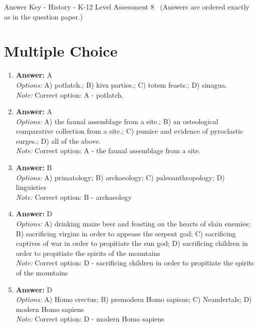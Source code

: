 \documentclass[12pt]{article}
\begin{document}
\begin{center}
Answer Key - History - K-12 Level Assessment 8 \
\small (Answers are ordered exactly as in the question paper.)
\end{center}

\section*{Multiple Choice}
\begin{enumerate}[label=\arabic*.]
\item \textbf{Answer:} A
\\ \textit{Options:} A) potlatch.; B) kiva parties.; C) totem feasts.; D) sinagua.
\\ \textit{Note:} Correct option: A - potlatch.
\item \textbf{Answer:} A
\\ \textit{Options:} A) the faunal assemblage from a site.; B) an osteological comparative collection from a site.; C) pumice and evidence of pyroclastic surges.; D) all of the above.
\\ \textit{Note:} Correct option: A - the faunal assemblage from a site.
\item \textbf{Answer:} B
\\ \textit{Options:} A) primatology; B) archaeology; C) paleoanthropology; D) linguistics
\\ \textit{Note:} Correct option: B - archaeology
\item \textbf{Answer:} D
\\ \textit{Options:} A) drinking maize beer and feasting on the hearts of slain enemies; B) sacrificing virgins in order to appease the serpent god; C) sacrificing captives of war in order to propitiate the sun god; D) sacrificing children in order to propitiate the spirits of the mountains
\\ \textit{Note:} Correct option: D - sacrificing children in order to propitiate the spirits of the mountains
\item \textbf{Answer:} D
\\ \textit{Options:} A) Homo erectus; B) premodern Homo sapiens; C) Neandertals; D) modern Homo sapiens
\\ \textit{Note:} Correct option: D - modern Homo sapiens
\end{enumerate}
\end{document}
